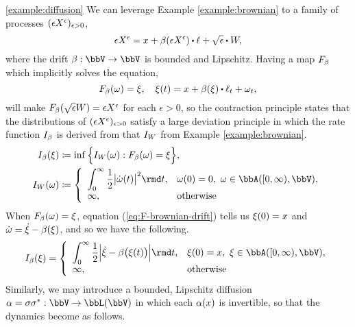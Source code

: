 \begin{example}[Diffusions]
  \ref{example:diffusion}
  We can leverage Example \ref{example:brownian} to a family of processes $(\epsilon X^\epsilon)_{\epsilon>0}$,
  \begin{equation*}
    \Xe = \stateVar + \affDrift(\Xe) \shortInt \leb + \sqrt\epsilon \shortInt \W,
  \end{equation*}
  where the drift $\affDrift: \vecSpace \rightarrow \vecSpace$ is bounded and Lipschitz.
  Having a map $F_\beta$ which implicitly solves the equation,
  \begin{equation}
    \label{eq:F-brownian-drift}
    F_\affDrift(\omega) = \pathVar, \quad \pathVar(t) = \stateVar + \affDrift(\pathVar) \shortInt \leb_t + \omega_t,
  \end{equation}
  will make $F_\beta(\sqrt\epsilon W) = \epsilon X^\epsilon$ for each $\epsilon > 0$, so the contraction principle states that the distributions of $(\epsilon X^\epsilon)_{\epsilon>0}$ satisfy a large deviation principle in which the rate function $I_\beta$ is derived from that $I_W$ from Example \ref{example:brownian}.
  \begin{align*}
    \rf_\affDrift(\pathVar) &\defeq \inf\Big\{ \rf_\W(\omega) : F_\affDrift(\omega) = \pathVar \Big\},\\
    \rf_\W(\omega) &\defeq \left\{\begin{array}{ll}
      \displaystyle\int_0^\infty \frac12\big|\dot\omega(t)\big|^2 \rmd t, & \omega(0) = 0, ~ \omega \in \acpathSpace{[0,\infty)}{\vecSpace}, \\
      \infty, & \text{otherwise}
    \end{array}\right.
  \end{align*}
  When $F_\beta(\omega) = \xi$, equation (\ref{eq:F-brownian-drift}) tells us $\xi(0) = x$ and $\dot\omega = \dot{\xi} - \beta(\xi)$, and so we have the following.
  \begin{equation*}
    \rf_\affDrift(\pathVar) = \left\{\begin{array}{ll}
      \displaystyle \int_0^\infty \frac12 \Big|\dot\pathVar - \affDrift\big(\pathVar(t)\big)\Big| \rmd t, & \pathVar(0) = \stateVar, ~ \pathVar \in \acpathSpace{[0,\infty)}{\vecSpace}, \\
      \infty, & \text{otherwise}
    \end{array}\right.
  \end{equation*}
  Similarly, we may introduce a bounded, Lipschitz diffusion $\affDiff = \affDiffSqrt\affDiffSqrt^*: \vecSpace \rightarrow \bbL(\vecSpace)$ in which each $\alpha(x)$ is invertible, so that the dynamics become as follows.

\end{example}
